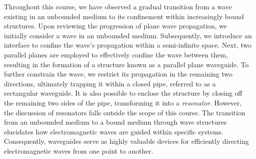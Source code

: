 Throughout this course, we have observed a gradual transition from a wave existing in an unbounded medium to its confinement within increasingly bound structures. Upon reviewing the progression of plane wave propagation, we initially consider a wave in an unbounded medium. Subsequently, we introduce an interface to confine the wave's propagation within a semi-infinite space. Next, two parallel planes are employed to effectively confine the wave between them, resulting in the formation of a structure known as a parallel plane waveguide. To further constrain the wave, we restrict its propagation in the remaining two directions, ultimately trapping it within a closed pipe, referred to as a rectangular waveguide. It is also possible to enclose the structure by closing off the remaining two sides of the pipe, transforming it into a \emph{resonator}. However, the discussion of resonators falls outside the scope of this course. The transition from an unbounded medium to a bound medium through wave structures elucidates how electromagnetic waves are guided within specific systems. Consequently, waveguides serve as highly valuable devices for efficiently directing electromagnetic waves from one point to another.
